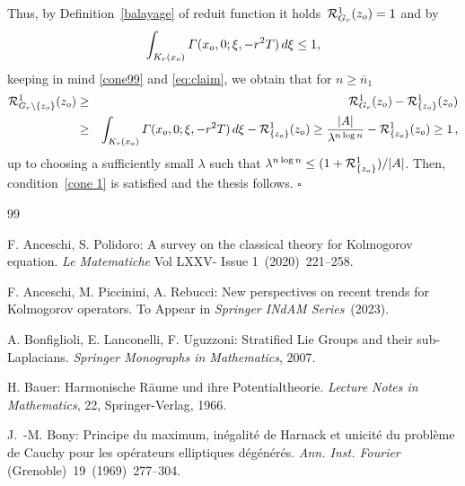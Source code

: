 \documentclass{amsart}
\numberwithin{equation}{section}
\def\vs{\vspace{1mm}}
\def \reduit{{\mathcal{R}}}
\renewcommand{\Gamma}{\varGamma}
\begin{document}
{ Thus, by Definition~\ref{balayage} of reduit function it holds~$\reduit^1_{G_r}(z_{\rm o}) = 1 $ and  by
 \[
 \int_{K_r(x_{\rm o}) }\Gamma(x_{\rm o},0; \xi,-r^2T) \, {\rm d}\xi \leq 1,
 \]
 keeping in mind \eqref{cone99} and \eqref{eq:claim}, we obtain that for $n \geq \bar{n}_1$
\begin{eqnarray*}
\reduit^1_{G_r \setminus \{z_{\rm o}\}}(z_{\rm o}) & \geq &  \reduit^1_{G_r}(z_{\rm o})- \reduit^1_{\{z_{\rm o}\}}(z_{\rm o})\\
& \geq & \int_{K_r(x_{\rm o}) }\Gamma(x_{\rm o},0; \xi,-r^2T) \, {\rm d}\xi  - \reduit^1_{\{z_{\rm o}\}}(z_{\rm o}) \geq \frac{|A|}{\lambda^{{n}\log {n}}}  - \reduit^1_{\{z_{\rm o}\}}(z_{\rm o}) \geq 1\,,
\end{eqnarray*}
up to choosing a sufficiently small $\lambda$ such that $\lambda^{n\log n} \leq (1+ \reduit^1_{\{z_{\rm o}\}})/|A|$. 
 Then, condition~\eqref{cone 1} is satisfied and the thesis follows.
\hfill $\square$




\vspace{3mm}



\begin{thebibliography}{99}

                
 {\sc F. Anceschi, S. Polidoro}:
               A survey on the classical theory for Kolmogorov equation.
               {\it Le Matematiche} Vol LXXV- Issue 1~(2020)~221--258.
               \vs
               
   {\sc F. Anceschi, M. Piccinini, A. Rebucci}:
               New perspectives on recent trends for Kolmogorov operators. To Appear in
               {\it Springer INdAM Series}~(2023).
               \vs
     
    {\sc A. Bonfiglioli, E. Lanconelli, F. Uguzzoni}:
                  Stratified Lie Groups and their sub-Laplacians.
                  {\it Springer Monographs in Mathematics}, 2007.    
                  \vs

 {\sc H. Bauer}:
                 Harmonische R\"aume und ihre Potentialtheorie.
                 {\it Lecture Notes in Mathematics}, 22, Springer-Verlag, 1966. 
                 \vs
                 
  {\sc J.~\!-M. Bony}:
                Principe du maximum, inégalité de Harnack et unicité du problème de Cauchy pour les opérateurs elliptiques dégénérés.
                {\it Ann. Inst. Fourier} (Grenoble)~19~(1969)~277--304.
                \vs


\end{thebibliography}}
\end{document}
